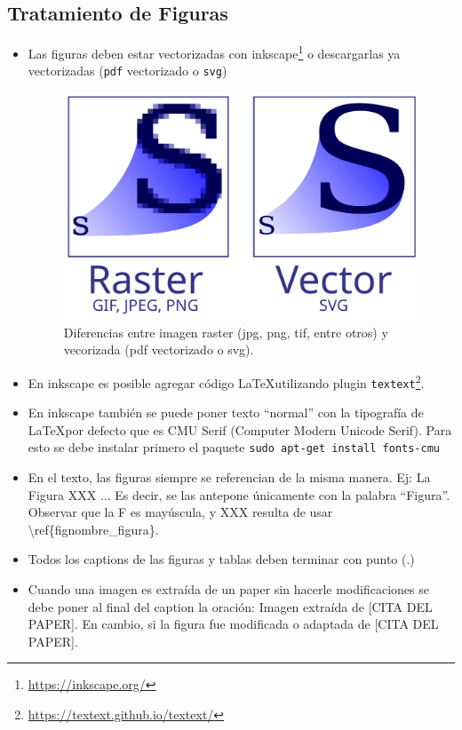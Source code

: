 \documentclass[a4paper,	11pt]{article}
\begin{document}
\subsection{Tratamiento de Figuras}
%
\begin{itemize}
    \item Las figuras deben estar vectorizadas con inkscape\footnote{\url{https://inkscape.org/}} o descargarlas ya vectorizadas (\lstinline{pdf} vectorizado o \lstinline{svg})
    
    \begin{figure}[!htbp]
        \centering
        \includegraphics[width=0.5\linewidth]{./images/bitmap_vs_svg.pdf}
        \caption{Diferencias entre imagen raster (jpg, png, tif, entre otros) y vecorizada (pdf vectorizado o svg).}
        \label{fig:bitmap_vs_svg}
    \end{figure}

    \item En inkscape es posible agregar código \LaTeX utilizando plugin \lstinline{textext}\footnote{\url{https://textext.github.io/textext/}}.
    \item En inkscape también se puede poner texto ``normal'' con la tipografía de \LaTeX por defecto que es CMU Serif  (Computer Modern Unicode Serif). Para esto se debe instalar primero el paquete \lstinline{sudo apt-get install fonts-cmu}
    \item En el texto, las figuras siempre se referencian de la misma manera. Ej: La Figura XXX ... Es decir, se las antepone únicamente con la palabra ``Figura''. Observar que la F es mayúscula, y XXX resulta de usar \textbackslash ref\{fig\:nombre\_figura\}.
    \item Todos los captions de las figuras y tablas deben terminar con punto (.)
    \item Cuando una imagen es extraída de un paper sin hacerle modificaciones se debe poner al final del caption la oración: Imagen extraída de [CITA DEL PAPER]. En cambio, si la figura fue modificada o adaptada de [CITA DEL PAPER].
\end{itemize}
\end{document}
